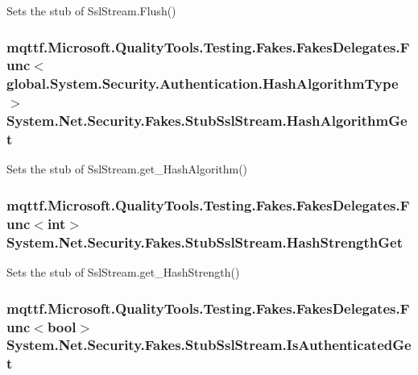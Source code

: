Sets the stub of Ssl\-Stream.\-Flush()

\hypertarget{class_system_1_1_net_1_1_security_1_1_fakes_1_1_stub_ssl_stream_ab262d5b2131d6ca8c1d70eb211203526}{
\subsubsection[{Hash\-Algorithm\-Get}]{\setlength{\rightskip}{0pt plus 5cm}mqttf.\-Microsoft.\-Quality\-Tools.\-Testing.\-Fakes.\-Fakes\-Delegates.\-Func$<$global.\-System.\-Security.\-Authentication.\-Hash\-Algorithm\-Type$>$ System.\-Net.\-Security.\-Fakes.\-Stub\-Ssl\-Stream.\-Hash\-Algorithm\-Get}}\label{class_system_1_1_net_1_1_security_1_1_fakes_1_1_stub_ssl_stream_ab262d5b2131d6ca8c1d70eb211203526}


Sets the stub of Ssl\-Stream.\-get\-\_\-\-Hash\-Algorithm()

\hypertarget{class_system_1_1_net_1_1_security_1_1_fakes_1_1_stub_ssl_stream_ac022ca28c366a9611d5a66cbdc826cc9}{
\subsubsection[{Hash\-Strength\-Get}]{\setlength{\rightskip}{0pt plus 5cm}mqttf.\-Microsoft.\-Quality\-Tools.\-Testing.\-Fakes.\-Fakes\-Delegates.\-Func$<$int$>$ System.\-Net.\-Security.\-Fakes.\-Stub\-Ssl\-Stream.\-Hash\-Strength\-Get}}\label{class_system_1_1_net_1_1_security_1_1_fakes_1_1_stub_ssl_stream_ac022ca28c366a9611d5a66cbdc826cc9}


Sets the stub of Ssl\-Stream.\-get\-\_\-\-Hash\-Strength()

\hypertarget{class_system_1_1_net_1_1_security_1_1_fakes_1_1_stub_ssl_stream_ab3f765506d38f72b58beb2d5f9bfc195}{
\subsubsection[{Is\-Authenticated\-Get}]{\setlength{\rightskip}{0pt plus 5cm}mqttf.\-Microsoft.\-Quality\-Tools.\-Testing.\-Fakes.\-Fakes\-Delegates.\-Func$<$bool$>$ System.\-Net.\-Security.\-Fakes.\-Stub\-Ssl\-Stream.\-Is\-Authenticated\-Get}}\label{class_system_1_1_net_1_1_security_1_1_fakes_1_1_stub_ssl_stream_ab3f765506d38f72b58beb2d5f9bfc195}


